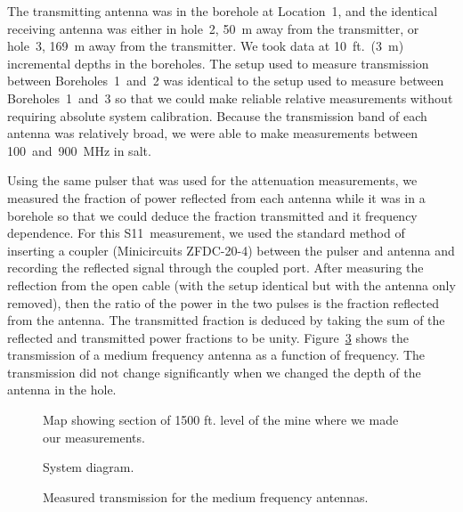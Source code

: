 \documentclass{elsart}
\begin{document}
  The transmitting antenna was in the borehole at 
  Location~1, and the identical receiving antenna was either in hole~2, 50~m away from the 
  transmitter, or hole~3, 169~m away from the transmitter.  We took data at 10~ft.~(3~m) 
  incremental depths in the boreholes.  The setup used to measure transmission between 
  Boreholes~1~and~2 was identical to the setup used to 
  measure between Boreholes~1~and~3 
  so that we could make reliable relative measurements without requiring absolute system 
  calibration.
  Because the transmission band of each antenna was relatively broad, we were able to make 
  measurements between 100~and~900~MHz in salt. 
  


  Using the same pulser that was used for the attenuation measurements,
  we measured the fraction of power reflected from each antenna while it
  was in a borehole  
  so that we could deduce the fraction transmitted and it frequency dependence. 
  For this S11~measurement, we used the standard method of inserting
  a coupler (Minicircuits ZFDC-20-4) between the pulser and antenna and 
  recording the reflected signal through the coupled port.
  After measuring the reflection
  from the open cable (with the setup identical but with the antenna only
  removed), then the ratio of the power in the 
  two pulses is the fraction reflected from the antenna.  The transmitted
  fraction is deduced by taking the sum of the 
  reflected and transmitted power fractions to be unity. 
  Figure~\ref{fig:s21} shows the transmission 
  of a medium frequency antenna as a function of frequency.  The transmission 
  did not change 
  significantly when we changed the depth of the antenna in the hole.  
  
  \begin{figure}
    \caption{Map showing section of 1500 ft. level of the mine where we made our measurements.}
    \label{fig:saltmap}
  \end{figure}
  \begin{figure}
    \caption{System diagram.}
    \label{fig:systemdiagram}
  \end{figure}
  \begin{figure}
    \caption{Measured transmission for the medium frequency antennas.}
    \label{fig:s21}
  \end{figure}
  
\end{document}
